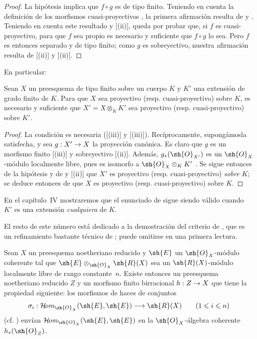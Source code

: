 \documentclass[oneside,10pt]{amsart}
\makeatletter
\renewcommand{\leq}{\leqslant}
\newcommand{\ega@arrow}[2]{\mathchoice{#1}{#2}{#2}{#2}}
\renewcommand{\to}{\ega@arrow{\longrightarrow}{\rightarrow}}
\def\shHom{\mathcal{H}\!\mathit{om}}
\let\EGAOriginalLabel\label
\renewcommand{\label}[1]{\phantomsection\EGAOriginalLabel{#1}}
\makeatother
\begin{document}
\begin{proof}
La hipótesis implica que $f\circ g$ es de tipo finito.
Teniendo en cuenta la definición de los morfismos cuasi-proyectivos , la primera afirmación resulta de  y .
Teniendo en cuenta este resultado y [(ii)], queda por probar que, si $f$ es cuasi-proyectivo, para que $f$ sea propio es necesario y suficiente que $f\circ g$ lo sea.
Pero $f$ es entonces separado  y de tipo finito;
como $g$ es sobreyectivo, nuestra afirmación resulta de [(ii)] y [(ii)].
\end{proof}

En particular:

\begin{corollary}[6.6.5]
\label{II.6.6.5}
Sean $X$ un preesquema de tipo finito sobre un cuerpo $K$ y $K'$ una extensión de grado finito de $K$.
Para que $X$ sea proyectivo \textup{(resp.} cuasi-proyectivo\textup{)} sobre $K$, es necesario y suficiente que $X'=X\otimes_K K'$ sea proyectivo \textup{(resp.} cuasi-proyectivo\textup{)} sobre $K'$.
\end{corollary}

\begin{proof}
La condición es necesaria ([(iii)] y [(iii)]).
Recíprocamente, supongámosla satisfecha, y sea $g:X'\to X$ la proyección canónica.
Es claro que $g$ es un morfismo finito [(iii)] y sobreyectivo [(ii)].
Además, $g_*(\sh{O}_{X'})$ es un $\sh{O}_X$-módulo localmente libre, pues es isomorfo a $\sh{O}_X\otimes_K K'$ .
Se sigue entonces de la hipótesis y de  y [(ii)] que $X'$ es proyectivo (resp. cuasi-proyectivo) \emph{sobre $K$};
se deduce entonces de  que $X$ es proyectivo (resp. cuasi-proyectivo) sobre $K$.
\end{proof}

En el capítulo~IV mostraremos que el enunciado de  sigue siendo válido cuando $K'$ es una extensión \emph{cualquiera} de $K$.

El resto de este número está dedicado a la demostración del criterio de , que es un refinamiento bastante técnico de ;
puede omitirse en una primera lectura.

\begin{lemma}[6.6.6]
\label{II.6.6.6}
Sean $X$ un preesquema noetheriano reducido y $\sh{E}$ un $\sh{O}_X$-módulo coherente tal que $\sh{E}\otimes_{\sh{O}_X}\sh{R}(X)$ sea un $\sh{R}(X)$-módulo localmente libre de rango constante~$n$.
Existe entonces un preesquema noetheriano reducido $Z$ y un morfismo finito birracional $h:Z\to X$ que tiene la propiedad siguiente: los morfismos de haces de conjuntos
\[
  \sigma_i:\shHom_{\sh{O}_X}(\sh{E},\sh{E})\to\sh{R}(X)
  \qquad\textup{($1\leq i\leq n$)}
\]
\textup{(cf. )} envían $\shHom_{\sh{O}_X}(\sh{E},\sh{E})$ en la $\sh{O}_X$-álgebra coherente $h_*(\sh{O}_Z)$.
\end{lemma}
\end{document}
